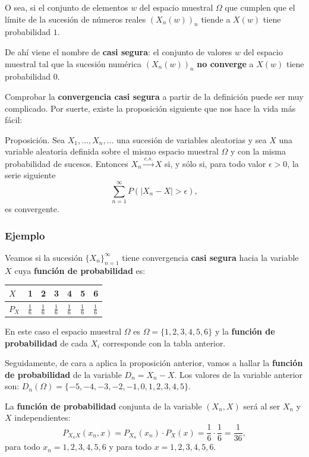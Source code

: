\documentclass[]{book}
\begin{document}
O sea, si el conjunto de elementos \(w\) del espacio muestral \(\Omega\) que cumplen que el límite de la sucesión de números reales \((X_n(w))_n\) tiende a \(X(w)\) tiene probabilidad \(1\).

De ahí viene el nombre de \textbf{casi segura}: el conjunto de valores \(w\) del espacio muestral tal que la sucesión numérica \((X_n(w))_n\) \textbf{no converge} a \(X(w)\) tiene probabilidad 0.

Comprobar la \textbf{convergencia casi segura} a partir de la definición puede ser muy complicado. Por suerte, existe la proposición siguiente que nos hace la vida más fácil:

 Proposición.
Sea \(X_1,\ldots,X_n,\ldots\) una sucesión de variables aleatorias y sea \(X\) una variable aleatoria definida sobre el mismo espacio muestral \(\Omega\) y con la misma probabilidad de sucesos.
Entonces \(X_n\stackrel{c.s.}{\longrightarrow}X\) si, y sólo si, para todo valor \(\epsilon >0\), la serie siguiente
\[
\sum_{n=1}^\infty P(|X_n-X|>\epsilon),
\]
es convergente.

\hypertarget{ejemplo-4}{%
\subsubsection{Ejemplo}\label{ejemplo-4}}

Veamos si la sucesión \(\{X_n\}_{n=1}^\infty\) tiene convergencia \textbf{casi segura} hacia la variable \(X\) cuya \textbf{función de probabilidad} es:

\begin{longtable}[]{@{}lllllll@{}}
\toprule
\(X\) & 1 & 2 & 3 & 4 & 5 & 6\tabularnewline
\midrule
\endhead
\(P_X\) & \(\frac{1}{6}\) & \(\frac{1}{6}\) & \(\frac{1}{6}\) & \(\frac{1}{6}\) & \(\frac{1}{6}\) & \(\frac{1}{6}\)\tabularnewline
\bottomrule
\end{longtable}

En este caso el espacio muestral \(\Omega\) es \(\Omega=\{1,2,3,4,5,6\}\) y la \textbf{función de probabilidad} de cada \(X_i\) corresponde con la tabla anterior.

Seguidamente, de cara a aplica la proposición anterior, vamos a hallar la \textbf{función de probabilidad} de la variable \(D_n=X_n-X\).
Los valores de la variable anterior son: \(D_n(\Omega)=\{-5,-4,-3,-2,-1,0,1,2,3,4,5\}\).

La \textbf{función de probabilidad} conjunta de la variable \((X_n,X)\) será al ser \(X_n\) y \(X\) independientes:
\[
P_{X_nX}(x_n,x)=P_{X_n}(x_n)\cdot P_X(x)=\frac{1}{6}\cdot \frac{1}{6}=\frac{1}{36},
\]
para todo \(x_n=1,2,3,4,5,6\) y para todo \(x=1,2,3,4,5,6\).
\end{document}
